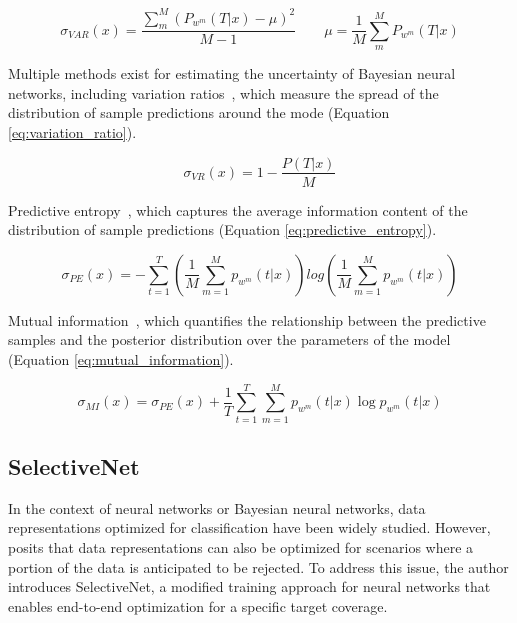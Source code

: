 \begin{equation}
	\sigma_{VAR}(x) = \frac{\sum_m^M (P_{w^m}(T|x) - \mu)^2}{M - 1} \qquad \mu = \frac{1}{M} \sum_m^M P_{w^m}(T|x)
	\label{eq:var_baysian_neural_network}
\end{equation}

Multiple methods exist for estimating the uncertainty of Bayesian neural networks, including variation ratios~\citep{freeman1965elementary}, which measure the spread of the distribution of sample predictions around the mode (Equation \ref{eq:variation_ratio}).

\begin{equation}
	\sigma_{VR}(x) = 1 - \frac{P(T|x)}{M}    
	\label{eq:variation_ratio}
\end{equation}

\noindent Predictive entropy~\citep{shannon1948mathematical}, which captures the average information content of the distribution of sample predictions (Equation \ref{eq:predictive_entropy}).
   
\begin{equation}
	\sigma_{PE}(x) = -\sum^{T}_{t=1}\left(\frac{1}{M}\sum^{M}_{m=1}p_{w^m}(t|x)\right)log\left(\frac{1}{M}\sum^{M}_{m=1}p_{w^m}(t|x)\right)
	\label{eq:predictive_entropy}
\end{equation}

\noindent Mutual information~\citep{houlsby2011bayesian}, which quantifies the relationship between the predictive samples and the posterior distribution over the parameters of the model (Equation \ref{eq:mutual_information}).

\begin{equation}
	\sigma_{MI}(x)=\sigma_{PE}(x)+\frac{1}{T}\sum^{T}_{t=1}\sum^{M}_{m=1}p_{w^m}(t|x)\log p_{w^m}(t|x)
	\label{eq:mutual_information}
\end{equation}

\subsection{SelectiveNet}
\label{subsec:selectivenet}
In the context of neural networks or Bayesian neural networks, data representations optimized for classification have been widely studied. However, \cite{selective2019geifman} posits that data representations can also be optimized for scenarios where a portion of the data is anticipated to be rejected. To address this issue, the author introduces SelectiveNet, a modified training approach for neural networks that enables end-to-end optimization for a specific target coverage.

